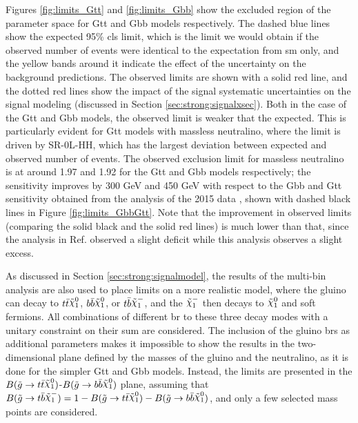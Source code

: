 Figures \ref{fig:limits_Gtt} and \ref{fig:limits_Gbb} show the excluded region of the parameter space for Gtt and Gbb models 
respectively. The dashed blue lines show the expected 95\% \gls{cls} limit, which is the limit we would obtain if the observed number of 
events were identical to the expectation from \gls{sm} only, and the yellow bands around it indicate the effect of the 
uncertainty on the background predictions. The observed limits are shown with a solid red line, and the dotted red lines show the impact 
of the signal systematic uncertainties on the signal modeling (discussed in Section \ref{sec:strong:signalxsec}). 
Both in the case of the Gtt and Gbb models, the observed limit is weaker that the expected. 
This is particularly evident for Gtt models with massless neutralino, where the limit is driven by SR-0L-HH, which has the largest deviation 
between expected and observed number of events.
The observed exclusion limit for massless neutralino is at around 1.97 and 1.92 for the Gtt and Gbb models respectively;
the sensitivity improves by 300 GeV and 450 GeV with respect to the Gbb and Gtt sensitivity obtained from the analysis of the 
2015 data \cite{Aad:2016eki}, shown with dashed black lines in Figure \ref{fig:limits_GbbGtt}. 
Note that the improvement in observed limits 
(comparing the solid black and the solid red lines) is much lower than that, since the analysis in Ref. \cite{Aad:2016eki}
observed a slight deficit while this analysis observes a slight excess. 

As discussed in Section \ref{sec:strong:signalmodel}, the results of the multi-bin analysis are also used to place 
limits on a more realistic model, where the gluino can decay to $ t \bar{t} \ninoone$, $ b \bar{b} \ninoone$, 
or $t \bar{b} \chinoonem$, and the $\chinoonem$ then decays to $\ninoone$ and soft fermions. All combinations of different \gls{br}
to these three decay modes with a unitary constraint on their sum are considered. 
The inclusion of the gluino \glspl{br} as additional parameters makes it impossible to show the results in the two-dimensional plane
defined by the masses of the gluino and the neutralino, as it is done for the simpler Gtt and Gbb models.
Instead, the limits are presented in the $B(\gluino \to t \bar{t} \ninoone)$-$B(\gluino \to b \bar{b} \ninoone)$ plane, 
assuming that $B(\gluino \to t \bar{b} \chinoonem) = 1 - B(\gluino \to t \bar{t} \ninoone) - B(\gluino \to b \bar{b} \ninoone)$, 
and only a few selected mass points are considered.  

